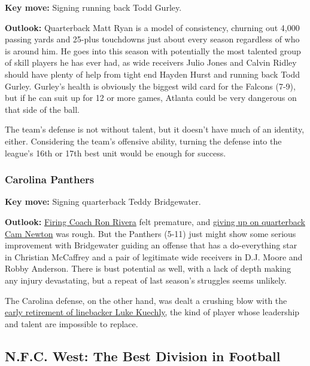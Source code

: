 \textbf{Key move:} Signing running back Todd Gurley.

\textbf{Outlook:} Quarterback Matt Ryan is a model of consistency,
churning out 4,000 passing yards and 25-plus touchdowns just about every
season regardless of who is around him. He goes into this season with
potentially the most talented group of skill players he has ever had, as
wide receivers Julio Jones and Calvin Ridley should have plenty of help
from tight end Hayden Hurst and running back Todd Gurley. Gurley's
health is obviously the biggest wild card for the Falcons (7-9), but if
he can suit up for 12 or more games, Atlanta could be very dangerous on
that side of the ball.

The team's defense is not without talent, but it doesn't have much of an
identity, either. Considering the team's offensive ability, turning the
defense into the league's 16th or 17th best unit would be enough for
success.

\hypertarget{carolina-panthers}{%
\subsubsection{\texorpdfstring{\textbf{Carolina
Panthers}}{Carolina Panthers}}\label{carolina-panthers}}

\textbf{Key move:} Signing quarterback Teddy Bridgewater.

\textbf{Outlook:}
\href{https://www.nytimes3xbfgragh.onion/2019/12/04/sports/football/why-was-ron-rivera-fired.html}{Firing
Coach Ron Rivera} felt premature, and
\href{https://www.nytimes3xbfgragh.onion/2020/03/24/sports/football/cam-newton-panthers-injury-release.html}{giving
up on quarterback Cam Newton} was rough. But the Panthers (5-11) just
might show some serious improvement with Bridgewater guiding an offense
that has a do-everything star in Christian McCaffrey and a pair of
legitimate wide receivers in D.J. Moore and Robby Anderson. There is
bust potential as well, with a lack of depth making any injury
devastating, but a repeat of last season's struggles seems unlikely.

The Carolina defense, on the other hand, was dealt a crushing blow with
the
\href{https://www.nytimes3xbfgragh.onion/2020/01/15/sports/football/luke-kuechly-concussions-retire.html}{early
retirement of linebacker Luke Kuechly,} the kind of player whose
leadership and talent are impossible to replace.

\hypertarget{nfc-west-the-best-division-in-football}{%
\subsection{N.F.C. West: The Best Division in
Football}\label{nfc-west-the-best-division-in-football}}

